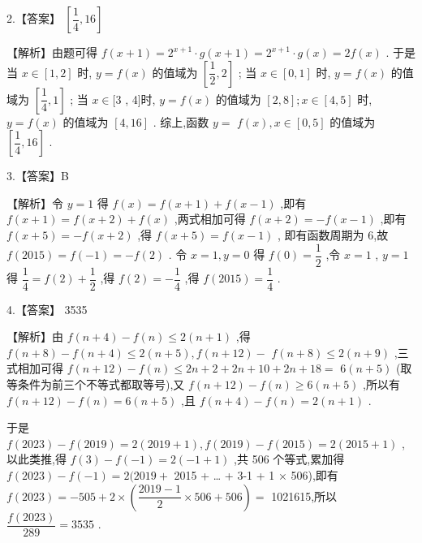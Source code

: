\documentclass[10pt]{article}
\begin{document}
2.【答案】 $\left\lbrack  {\dfrac{1}{4},{16}}\right\rbrack$

【解析】由题可得 $f\left( {x + 1}\right)  = {2}^{x + 1} \cdot  g\left( {x + 1}\right)  = {2}^{x + 1} \cdot  g\left( x\right)  = {2f}\left( x\right)$ . 于是当 $x \in  \left\lbrack  {1,2}\right\rbrack$ 时, $y = f\left( x\right)$ 的值域为 $\left\lbrack  {\dfrac{1}{2},2}\right\rbrack$ ; 当 $x \in  \left\lbrack  {0,1}\right\rbrack$ 时, $y = f\left( x\right)$ 的值域为 $\left\lbrack  {\dfrac{1}{4},1}\right\rbrack$ ; 当 $x \in  \lbrack 3$ , 4]时, $y = f\left( x\right)$ 的值域为 $\left\lbrack  {2,8}\right\rbrack  ;x \in  \left\lbrack  {4,5}\right\rbrack$ 时, $y = f\left( x\right)$ 的值域为 $\left\lbrack  {4,{16}}\right\rbrack$ . 综上,函数 $y =$  $f\left( x\right) ,x \in  \left\lbrack  {0,5}\right\rbrack$ 的值域为 $\left\lbrack  {\dfrac{1}{4},{16}}\right\rbrack$ .

3.【答案】B

【解析】令 $y = 1$ 得 $f\left( x\right)  = f\left( {x + 1}\right)  + f\left( {x - 1}\right)$ ,即有 $f\left( {x + 1}\right)  = f\left( {x + 2}\right)  + f\left( x\right)$ ,两式相加可得 $f\left( {x + 2}\right)  =  - f\left( {x - 1}\right)$ ,即有 $f\left( {x + 5}\right)  =  - f\left( {x + 2}\right)$ ,得 $f\left( {x + 5}\right)  = f\left( {x - 1}\right)$ , 即有函数周期为 6,故 $f\left( {2015}\right)  = f\left( {-1}\right)  =  - f\left( 2\right)$ . 令 $x = 1,y = 0$ 得 $f\left( 0\right)  = \dfrac{1}{2}$ ,令 $x = 1$ , $y = 1$ 得 $\dfrac{1}{4} = f\left( 2\right)  + \dfrac{1}{2}$ ,得 $f\left( 2\right)  =  - \dfrac{1}{4}$ ,得 $f\left( {2015}\right)  = \dfrac{1}{4}$ .

4.【答案】 3535

【解析】由 $f\left( {n + 4}\right)  - f\left( n\right)  \leq  2\left( {n + 1}\right)$ ,得 $f\left( {n + 8}\right)  - f\left( {n + 4}\right)  \leq  2\left( {n + 5}\right) ,f\left( {n + {12}}\right)  -$  $f\left( {n + 8}\right)  \leq  2\left( {n + 9}\right)$ ,三式相加可得 $f\left( {n + {12}}\right)  - f\left( n\right)  \leq  {2n} + 2 + {2n} + {10} + {2n} + {18} =$  $6\left( {n + 5}\right)$ (取等条件为前三个不等式都取等号),又 $f\left( {n + {12}}\right)  - f\left( n\right)  \geq  6\left( {n + 5}\right)$ ,所以有 $f\left( {n + {12}}\right)  - f\left( n\right)  = 6\left( {n + 5}\right)$ ,且 $f\left( {n + 4}\right)  - f\left( n\right)  = 2\left( {n + 1}\right)$ .

于是 $f\left( {2023}\right)  - f\left( {2019}\right)  = 2\left( {{2019} + 1}\right) ,f\left( {2019}\right)  - f\left( {2015}\right)  = 2\left( {{2015} + 1}\right)$ ,以此类推,得 $f\left( 3\right)  - f\left( {-1}\right)  = 2\left( {-1 + 1}\right)$ ,共 506 个等式,累加得 $f\left( {2023}\right)  - f\left( {-1}\right)  = 2({2019} +$ 2015 + … + 3-1 + 1 × 506),即有 $f\left( {2023}\right)  =  - {505} + 2 \times  \left( {\dfrac{{2019} - 1}{2} \times  {506} + {506}}\right)  =$ 1021615,所以 $\dfrac{f\left( {2023}\right) }{289} = {3535}$ .
\end{document}
